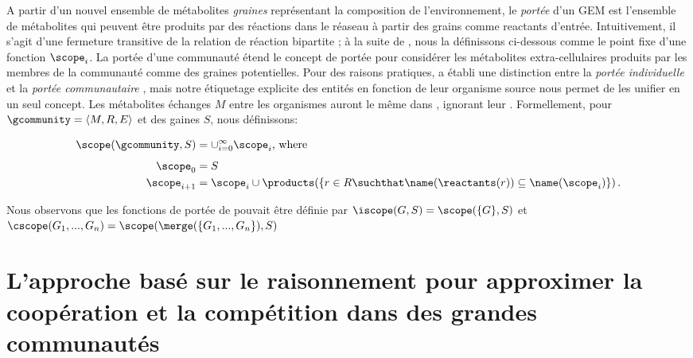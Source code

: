 A partir d'un nouvel ensemble de métabolites \emph{graines} représentant la composition de l'environnement, le \emph{portée} d'un GEM est l'ensemble de métabolites qui peuvent être produits par des réactions dans le réaseau à partir des grains comme reactants d'entrée. Intuitivement, il s'agit d'une fermeture transitive de la relation de réaction bipartite ; à la suite de \citep{Handorf2005}, nous la définissons ci-dessous comme le point fixe d'une fonction $\scope_i$. La portée d'une communauté étend le concept de portée pour considérer les métabolites extra-cellulaires produits par les membres de la communauté comme des graines potentielles. Pour des raisons pratiques, \citep{Frioux2018} a établi une distinction entre la \emph{portée individuelle} \iscope et la \emph{portée communautaire} \cscope, mais notre étiquetage explicite des entités en fonction de leur organisme source nous permet de les unifier en un seul concept. Les métabolites échanges $M$ entre les organismes auront le même \name dans \Ms, ignorant leur \source. Formellement, pour \( \gcommunity %
               = \langle M, R, E \rangle
\)
et des gaines $S$, nous définissons:

\[
\begin{split}
    \scope(\gcommunity,S) & = \cup^{\infty}_{i=0} \scope_i \mbox{, where} \\[1ex]
    \scope_0 & = S\\
    \scope_{i+1} & = \scope_i \cup \products(\{ r \in R \suchthat \name(\reactants(r)) \subseteq \name(\scope_i) \}) \,.
\end{split}
\]

Nous observons que les fonctions de portée de \citep{Belcour.2020} pouvait être définie par $\iscope(G,S) = \scope(\{ G \}, S)$
et 
$\cscope(G_1,...,G_n) = \scope(\merge(\{ G_1,...,G_n \}), S)$

\section{L'approche basé sur le raisonnement pour approximer la coopération et la compétition dans des grandes communautés}
\label{answers}

